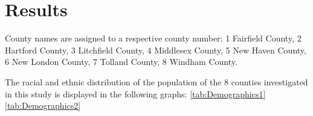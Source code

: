 \documentclass[12pt]{article}
\begin{document}
\section{Results}\label{sec:resu}

County names are assigned to a respective county number: 
1	Fairfield County,
2	Hartford County,
3	Litchfield County,
4	Middlesex County,
5	New Haven County,
6	New London County,
7	Tolland County,
8	Windham County.

The racial and ethnic distribution of the population of the 8 counties investigated in this study is displayed in the following graphs:
\ref{tab:Demographics1}
\ref{tab:Demographics2}


\begin{table}[h]
\label{tab:Demographics1}
  \caption{Demographics and Education Levels for Counties 1-4}
\end{table}
\end{document}
